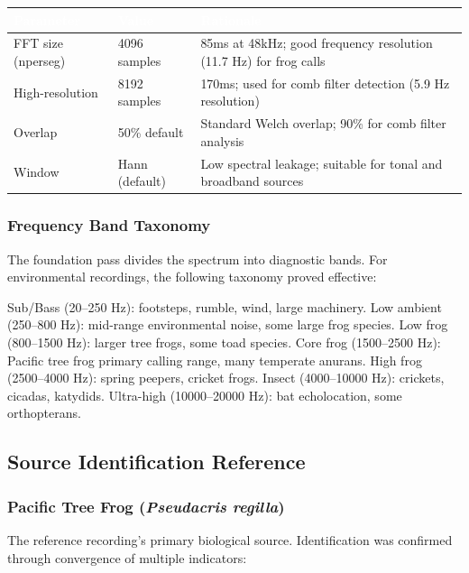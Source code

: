\documentclass[11pt,letterpaper]{article}
\newcommand{\tableheader}[1]{\textbf{\sffamily\textcolor{white}{#1}}}
\begin{document}
\begin{center}
\begin{tabularx}{\textwidth}{L{3.5cm}L{2.5cm}X}
\toprule
{}
\tableheader{Parameter} & \tableheader{Value} & \tableheader{Rationale} \\
\midrule
FFT size (nperseg) & 4096 samples & 85ms at 48kHz; good frequency resolution (11.7 Hz) for frog calls \\
High-resolution & 8192 samples & 170ms; used for comb filter detection (5.9 Hz resolution) \\
Overlap & 50\% default & Standard Welch overlap; 90\% for comb filter analysis \\
Window & Hann (default) & Low spectral leakage; suitable for tonal and broadband sources \\
\bottomrule
\end{tabularx}
\end{center}

\subsubsection{Frequency Band Taxonomy}

The foundation pass divides the spectrum into diagnostic bands. For environmental recordings, the following taxonomy proved effective:

Sub/Bass (20--250 Hz): footsteps, rumble, wind, large machinery. Low ambient (250--800 Hz): mid-range environmental noise, some large frog species. Low frog (800--1500 Hz): larger tree frogs, some toad species. Core frog (1500--2500 Hz): Pacific tree frog primary calling range, many temperate anurans. High frog (2500--4000 Hz): spring peepers, cricket frogs. Insect (4000--10000 Hz): crickets, cicadas, katydids. Ultra-high (10000--20000 Hz): bat echolocation, some orthopterans.

\subsection{Source Identification Reference}

\subsubsection{Pacific Tree Frog (\textit{Pseudacris regilla})}

The reference recording's primary biological source. Identification was confirmed through convergence of multiple indicators:
\end{document}

